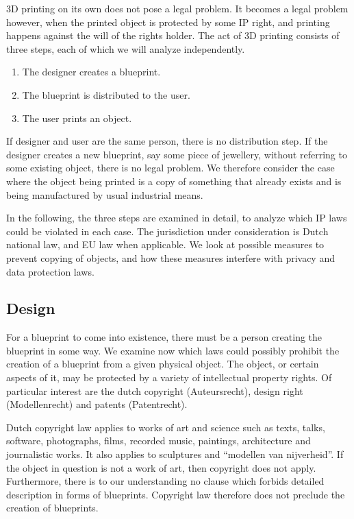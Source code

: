 3D printing on its own does not pose a legal problem.
It becomes a legal problem however, when the printed object is protected by 
some IP right, and printing happens against the will of the rights holder.
The act of 3D printing consists of three steps, each of which we will analyze 
independently.
\begin{enumerate}
  \item The designer creates a blueprint.
  \item The blueprint is distributed to the user.
  \item The user prints an object.
\end{enumerate}

If designer and user are the same person, there is no distribution step.
If the designer creates a new blueprint, say some piece of jewellery, without referring to some existing object, there is no legal problem.
We therefore consider the case where the object being printed is a copy of something that already exists and is being manufactured by usual industrial means.

In the following, the three steps are examined in detail, to analyze which IP laws could be violated in each case.
The jurisdiction under consideration is Dutch national law, and EU law when applicable.
We look at possible measures to prevent copying of objects, and how these measures interfere with privacy and data protection laws.

\subsection{Design}
For a blueprint to come into existence, there must be a person creating the blueprint in some way.
We examine now which laws could possibly prohibit the creation of a blueprint from a given physical object.
The object, or certain aspects of it, may be protected by a variety of intellectual property rights.
Of particular interest are the dutch copyright (Auteursrecht), design right (Modellenrecht) and patents (Patentrecht).

Dutch copyright law applies to works of art and science such as texts, talks, software, photographs, films, recorded music, paintings, architecture and journalistic works. %
It also applies to sculptures and ``modellen van nijverheid''.
If the object in question is not a work of art, then copyright does not apply. Furthermore, there is to our understanding no clause which forbids detailed description in forms of blueprints.
Copyright law therefore does not preclude the creation of blueprints.

